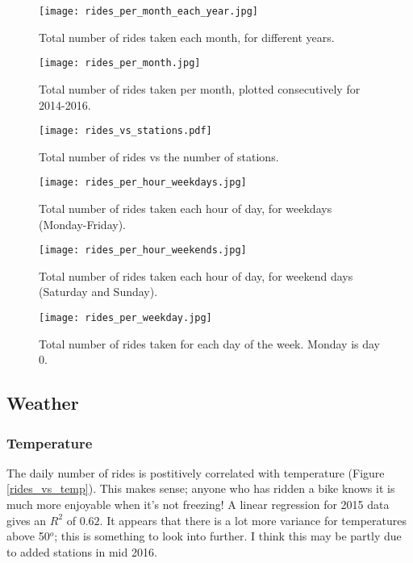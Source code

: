 \documentclass[11pt]{article}
\begin{document}
\begin{figure}[htb]
\texttt{[image: rides\_per\_month\_each\_year.jpg]}
\caption{Total number of rides taken each month, for different years.}
\label{rides_vs_month_eachyear}
\end{figure}

\begin{figure}[htb]
\texttt{[image: rides\_per\_month.jpg]}
\caption{Total number of rides taken per month, plotted consecutively for 2014-2016.}
\label{rides_vs_month}
\end{figure}



\begin{figure}[htb]
\texttt{[image: rides\_vs\_stations.pdf]}
\caption{Total number of rides vs the number of stations.}
\label{rides_vs_stations}
\end{figure}




\begin{figure}[htb]
\texttt{[image: rides\_per\_hour\_weekdays.jpg]}
\caption{Total number of rides taken each hour of day, for weekdays (Monday-Friday).}
\label{rides_vs_hr_wkday}
\end{figure}

\begin{figure}[htb]
\texttt{[image: rides\_per\_hour\_weekends.jpg]}
\caption{Total number of rides taken each hour of day, for weekend days (Saturday and Sunday).}
\label{rides_vs_hr_wkend}
\end{figure}


\begin{figure}[h]
\texttt{[image: rides\_per\_weekday.jpg]}
\caption{Total number of rides taken for each day of the week. Monday is day 0.}
\label{rides_vs_dyofwk}
\end{figure}



\clearpage
\subsection{Weather}


\clearpage
\subsubsection{Temperature}

The daily number of rides is postitively correlated with temperature (Figure \ref{rides_vs_temp}). This makes sense; anyone who has ridden a bike knows it is much more enjoyable when it's not freezing! A linear regression for 2015 data gives an $R^2$ of $0.62$. It appears that there is a lot more variance for temperatures above 50$^o$; this is something to look into further. I think this may be partly due to added stations in mid 2016.
\end{document}
